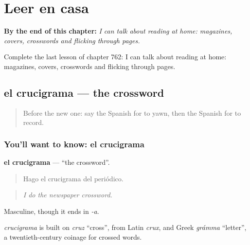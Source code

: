 
\chapter{Leer en casa}
\label{ch:es-leer-en-casa}

\begin{chapteropening}
\textbf{By the end of this chapter:} \emph{I can talk about reading at home: magazines, covers, crosswords and flicking through pages.}

Complete the last lesson of chapter 762: I can talk about reading at home: magazines, covers, crosswords and flicking through pages.
\end{chapteropening}

\section[el crucigrama]{el crucigrama — the crossword}

\label{lesson:ES-C762-crucigrama}



\begin{quote}
Before the new one: say the Spanish for to yawn, then the Spanish for to record.
\end{quote}

\subsection*{You'll want to know: el crucigrama}
\textbf{el crucigrama} — \textquotedblleft{}the crossword\textquotedblright{}.

\begin{quote}
Hago el crucigrama del periódico.
\end{quote}

\begin{quote}
\emph{I do the newspaper crossword.}
\end{quote}

Masculine, though it ends in \emph{-a}.

\begin{cousinweb}
\emph{crucigrama} is built on \emph{cruz} \textquotedblleft{}cross\textquotedblright{}, from Latin \emph{crux}, and Greek \emph{grámma} \textquotedblleft{}letter\textquotedblright{}, a twentieth-century coinage for crossed words.
\end{cousinweb}

